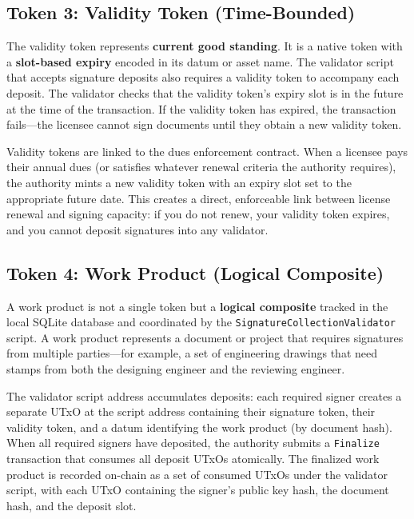 \subsection{Token 3: Validity Token (Time-Bounded)}

The validity token represents \textbf{current good standing}. It is a native token with a \textbf{slot-based expiry} encoded in its datum or asset name. The validator script that accepts signature deposits also requires a validity token to accompany each deposit. The validator checks that the validity token's expiry slot is in the future at the time of the transaction. If the validity token has expired, the transaction fails---the licensee cannot sign documents until they obtain a new validity token.

Validity tokens are linked to the dues enforcement contract. When a licensee pays their annual dues (or satisfies whatever renewal criteria the authority requires), the authority mints a new validity token with an expiry slot set to the appropriate future date. This creates a direct, enforceable link between license renewal and signing capacity: if you do not renew, your validity token expires, and you cannot deposit signatures into any validator.

\subsection{Token 4: Work Product (Logical Composite)}

A work product is not a single token but a \textbf{logical composite} tracked in the local SQLite database and coordinated by the \texttt{SignatureCollectionValidator} script. A work product represents a document or project that requires signatures from multiple parties---for example, a set of engineering drawings that need stamps from both the designing engineer and the reviewing engineer.

The validator script address accumulates deposits: each required signer creates a separate UTxO at the script address containing their signature token, their validity token, and a datum identifying the work product (by document hash). When all required signers have deposited, the authority submits a \texttt{Finalize} transaction that consumes all deposit UTxOs atomically. The finalized work product is recorded on-chain as a set of consumed UTxOs under the validator script, with each UTxO containing the signer's public key hash, the document hash, and the deposit slot.

